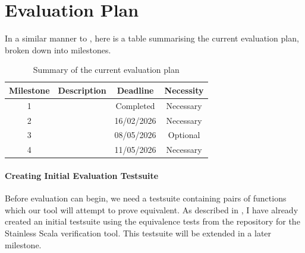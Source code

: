 \section{Evaluation Plan}\label{sec:evaluation-plan}

In a similar manner to , here is a table summarising the current evaluation plan, broken down into milestones.

\begin{table}[ht]
  \centering
  \begin{tabular}{ |c|c|c|c| } 
  \hline
  Milestone & Description & Deadline & Necessity \\
    \hline
    1 & \nameref{para:init-eval-testsuite} & Completed & Necessary \\
    \hline
    2 & \nameref{para:evaluation-data-gathering} & 16/02/2026 & Necessary \\
    \hline
    3 & \nameref{para:testsuite-development} & 08/05/2026 & Optional \\
    \hline
    4 & \nameref{para:benchmark-comparison} & 11/05/2026 & Necessary \\
    \hline
  \end{tabular}
  \caption{Summary of the current evaluation plan}
\end{table}

\paragraph{Creating Initial Evaluation Testsuite}\label{para:init-eval-testsuite} Before evaluation can begin, we need a testsuite containing pairs of functions which our tool will attempt to prove equivalent. As described in , I have already created an initial testsuite using the equivalence tests from the repository for the Stainless Scala verification tool\cite{StainlessFrontendsBenchmarks}. This testsuite will be extended in a later milestone. 

